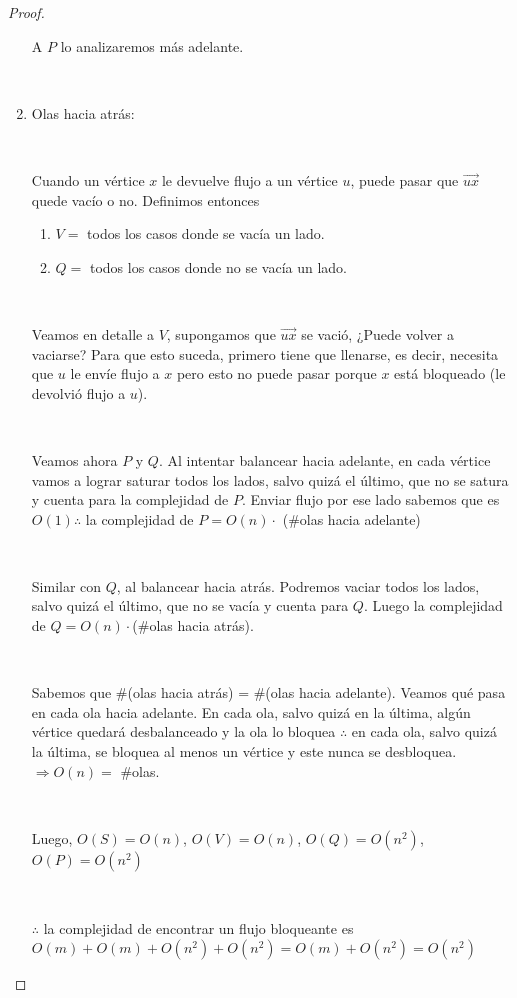 \documentclass[11pt]{article}
\begin{document}
\begin{proof}
\begin{enumerate}
A $P$ lo analizaremos más adelante.\par
\

\item Olas hacia atrás:\par
\

Cuando un vértice $x$ le devuelve flujo a un vértice $u$, puede pasar que $\overrightarrow{ux}$ quede vacío o no. Definimos entonces \par
\begin{enumerate}
	\item $V = $ todos los casos donde se vacía un lado.\par
	\item $Q = $ todos los casos donde no se vacía un lado.\par
\end{enumerate}
\

Veamos en detalle a $V$, supongamos que  $\overrightarrow{ux}$ se vació, ¿Puede volver a vaciarse? Para que esto suceda, primero tiene que llenarse, es decir, necesita que $u$ le envíe flujo a $x$ pero esto no puede pasar porque $x$ está bloqueado (le devolvió flujo a $u$).\par
\

Veamos ahora $P$ y $Q$. Al intentar balancear hacia adelante, en cada vértice vamos a lograr saturar todos los lados, salvo quizá el último, que no se satura y cuenta para la complejidad de $P$. Enviar flujo por ese lado sabemos que es $O(1) \therefore$ la complejidad de $P = O(n) \cdot$ (\#olas hacia adelante) \par
\

Similar con $Q$, al balancear hacia atrás. Podremos vaciar todos los lados, salvo quizá el último, que no se vacía y cuenta para $Q$. Luego la complejidad de $Q = O(n) \cdot $(\#olas hacia atrás). \par
\

Sabemos que \#(olas hacia atrás) = \#(olas hacia adelante). Veamos qué pasa en cada ola hacia adelante. En cada ola, salvo quizá en la última, algún vértice quedará desbalanceado y la ola lo bloquea $\therefore$ en cada ola, salvo quizá la última, se bloquea al menos un vértice y este nunca se desbloquea. $\Rightarrow O(n) = $ \#olas.\par
\

Luego, $O(S) = O(n)$,  $O(V) = O(n)$, $O(Q) = O(n^{2})$, $O(P) = O(n^{2})$ \par
\

$\therefore$ la complejidad de encontrar un flujo bloqueante es $O(m) + O(m) + O(n^{2}) + O(n^{2}) = O(m) + O(n^{2}) = O(n^{2})$


\end{enumerate}

\end{proof}
\end{document}
